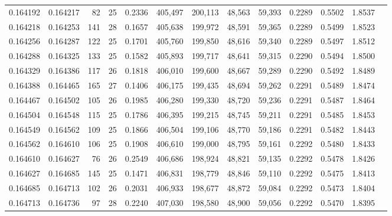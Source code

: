 \begin{tabular}{rrrrrrrrrrrrr}
0.164192 & 0.164217 &  82 &  25 &                                     0.2336 & 405,497 & 200,113 &  48,563 &  59,393 & 0.2289 & 0.5502 & 1.8537 \\
0.164218 & 0.164253 & 141 &  28 &                                     0.1657 & 405,638 & 199,972 &  48,591 &  59,365 & 0.2289 & 0.5499 & 1.8523 \\
0.164256 & 0.164287 & 122 &  25 &                                     0.1701 & 405,760 & 199,850 &  48,616 &  59,340 & 0.2289 & 0.5497 & 1.8512 \\
0.164288 & 0.164325 & 133 &  25 &                                     0.1582 & 405,893 & 199,717 &  48,641 &  59,315 & 0.2290 & 0.5494 & 1.8500 \\
0.164329 & 0.164386 & 117 &  26 &                                     0.1818 & 406,010 & 199,600 &  48,667 &  59,289 & 0.2290 & 0.5492 & 1.8489 \\
0.164388 & 0.164465 & 165 &  27 &                                     0.1406 & 406,175 & 199,435 &  48,694 &  59,262 & 0.2291 & 0.5489 & 1.8474 \\
0.164467 & 0.164502 & 105 &  26 &                                     0.1985 & 406,280 & 199,330 &  48,720 &  59,236 & 0.2291 & 0.5487 & 1.8464 \\
0.164504 & 0.164548 & 115 &  25 &                                     0.1786 & 406,395 & 199,215 &  48,745 &  59,211 & 0.2291 & 0.5485 & 1.8453 \\
0.164549 & 0.164562 & 109 &  25 &                                     0.1866 & 406,504 & 199,106 &  48,770 &  59,186 & 0.2291 & 0.5482 & 1.8443 \\
0.164562 & 0.164610 & 106 &  25 &                                     0.1908 & 406,610 & 199,000 &  48,795 &  59,161 & 0.2292 & 0.5480 & 1.8433 \\
0.164610 & 0.164627 &  76 &  26 &                                     0.2549 & 406,686 & 198,924 &  48,821 &  59,135 & 0.2292 & 0.5478 & 1.8426 \\
0.164627 & 0.164685 & 145 &  25 &                                     0.1471 & 406,831 & 198,779 &  48,846 &  59,110 & 0.2292 & 0.5475 & 1.8413 \\
0.164685 & 0.164713 & 102 &  26 &                                     0.2031 & 406,933 & 198,677 &  48,872 &  59,084 & 0.2292 & 0.5473 & 1.8404 \\
0.164713 & 0.164736 &  97 &  28 &                                     0.2240 & 407,030 & 198,580 &  48,900 &  59,056 & 0.2292 & 0.5470 & 1.8395 \\

\end{tabular}
